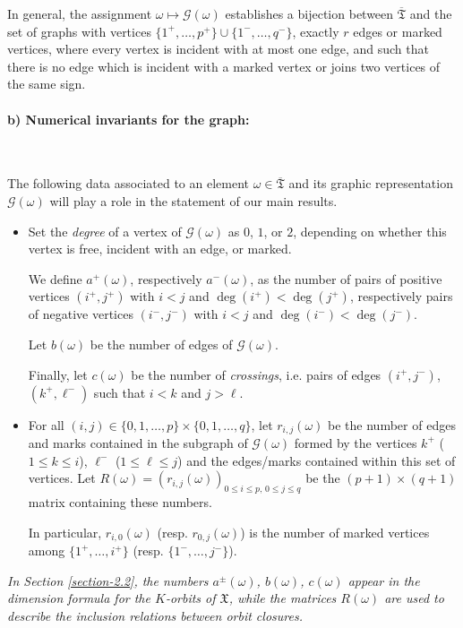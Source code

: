 \documentclass[11pt]{article}
\theoremstyle{definition}
\numberwithin{equation}{section}
\newcommand{\ppermutationsof}{\mathfrak{T}}
\newcommand{\parameters}{\overline{\ppermutationsof}}
\newcommand{\Xfv}{\mathfrak{X}}
\begin{document}
In general, the assignment $\omega\mapsto\mathcal{G}(\omega)$ establishes a bijection between $\parameters$ and the set of graphs with vertices %
$\{1^+,\ldots,p^+\}\cup\{1^-,\ldots,q^-\}$,
exactly $r$ edges or marked vertices, where every vertex is incident with at most one edge, and such that there is no edge which is incident with a marked vertex or joins two vertices of the same sign.


\paragraph{\bf b) Numerical invariants for the graph:}\

The following data associated to an element $\omega\in\parameters$ and its graphic representation $\mathcal{G}(\omega)$ will play a role in the statement of our main results.
\begin{itemize}
\item Set the {\em degree} of a vertex of $\mathcal{G}(\omega)$ as $0$, $1$, or $2$, depending on whether this vertex is free, incident with an edge, or marked.

We define $a^+(\omega)$, respectively $a^-(\omega)$, as the number of pairs
of positive vertices $(i^+,j^+)$ with $i<j$ and $\deg(i^+)<\deg(j^+)$,
respectively pairs of negative vertices $(i^-,j^-)$ with $i<j$ and $\deg(i^-)<\deg(j^-)$.

Let $b(\omega)$ be the number of edges of $\mathcal{G}(\omega)$.

Finally, let $c(\omega)$ be the number of \textit{crossings}, i.e. pairs of edges $(i^+,j^-)$, $(k^+,\ell^-)$ such that $i<k$ and $j>\ell$.

\item For all $(i,j)\in\{0,1,\ldots,p\}\times\{0,1,\ldots,q\}$, let $r_{i,j}(\omega)$ be the number of edges and marks contained in the subgraph of $\mathcal{G}(\omega)$ formed by the vertices $k^+$ ($1\leq k\leq i$), $\ell^-$ ($1\leq \ell\leq j$) and the edges/marks contained within this set of vertices. Let $R(\omega)=\left( r_{i,j}(\omega) \right)_{0\leq i\leq p,\,0\leq j\leq q}$ be the $(p+1)\times(q+1)$ matrix containing these numbers.

In particular, $r_{i,0}(\omega)$ (resp. $r_{0,j}(\omega)$) is the
number of marked vertices among
$\{1^+,\ldots,i^+\}$ (resp. $\{1^-,\ldots,j^-\}$).
\end{itemize}
{\em In Section \ref{section-2.2}, the numbers $a^\pm(\omega)$, $b(\omega)$, $c(\omega)$ appear in the dimension formula for the $K$-orbits of $\Xfv$, while the matrices $R(\omega)$ are used to describe the inclusion relations between orbit closures.}
\end{document}
